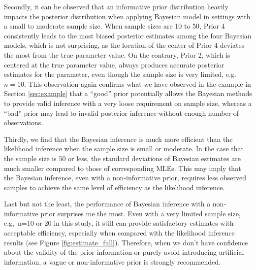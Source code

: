 \documentclass{article}
\numberwithin{equation}{section}
\theoremstyle{plain}
\begin{document}
Secondly, it can be observed that an informative prior distribution heavily impacts the posterior distribution when applying Bayesian model in settings with a small to moderate sample size. When sample sizes are 10 to 50, Prior 4 consistently leads to the most biased posterior estimates among the four Bayesian models, which is not surprising, as the location of the center of Prior 4 deviates the most from the true parameter value. On the contrary, Prior 2, which is centered at the true parameter value, always produces accurate posterior estimates for the parameter, even though the sample size is very limited, e.g.\ $n=10$. This observation again confirms what we have observed in the example in Section \ref{sec:example} that a ``good'' prior potentially allows the Bayesian methods to provide valid inference with a very loose requirement on sample size, whereas a ``bad'' prior may lead to invalid posterior inference without enough number of observations.

Thirdly, we find that the Bayesian inference is much more efficient than the likelihood inference when the sample size is small or moderate. In the case that the sample size is 50 or less, the standard deviations of Bayesian estimates are much smaller compared to those of corresponding MLEs. This may imply that the Bayesian inference, even with a non-informative prior, requires less observed samples to achieve the same level of efficiency as the likelihood inference. 

Last but not the least, the performance of Bayesian inference with a non-informative prior surprises me the most. Even with a very limited sample size, e.g,\ n=10 or 20 in this study, it still can provide satisfactory estimates with acceptable efficiency, especially when compared with the likelihood inference results (see Figure \ref{fig:estimate_full}). Therefore, when we don't have confidence about the validity of the prior information or purely avoid introducing artificial information, a vague or non-informative prior is strongly recommended. 
\end{document}
